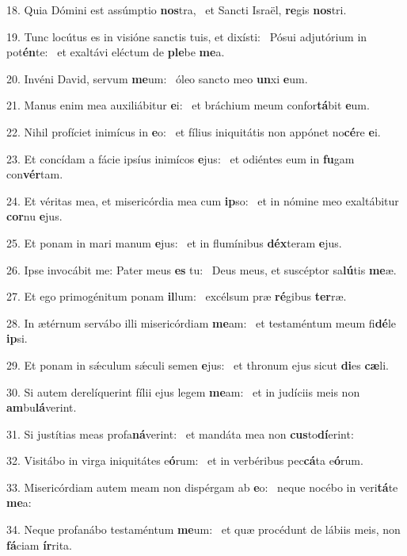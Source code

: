 18. Quia Dómini est assúmptio \textbf{nos}tra, \ast\  et Sancti Israël, \textbf{re}gis \textbf{nos}tri.\

19. Tunc locútus es in visióne sanctis tuis, et dixísti: \dag\  Pósui adjutórium in pot\textbf{én}te: \ast\  et exaltávi eléctum de \textbf{ple}be \textbf{me}a.\

20. Invéni David, servum \textbf{me}um: \ast\  óleo sancto meo \textbf{un}xi \textbf{e}um.\

21. Manus enim mea auxiliábitur \textbf{e}i: \ast\  et bráchium meum confor\textbf{tá}bit \textbf{e}um.\

22. Nihil profíciet inimícus in \textbf{e}o: \ast\  et fílius iniquitátis non appónet no\textbf{cé}re \textbf{e}i.\

23. Et concídam a fácie ipsíus inimícos \textbf{e}jus: \ast\  et odiéntes eum in \textbf{fu}gam con\textbf{vér}tam.\

24. Et véritas mea, et misericórdia mea cum \textbf{ip}so: \ast\  et in nómine meo exaltábitur \textbf{cor}nu \textbf{e}jus.\

25. Et ponam in mari manum \textbf{e}jus: \ast\  et in flumínibus \textbf{déx}teram \textbf{e}jus.\

26. Ipse invocábit me: Pater meus \textbf{es} tu: \ast\  Deus meus, et suscéptor sa\textbf{lú}tis \textbf{me}æ.\

27. Et ego primogénitum ponam \textbf{il}lum: \ast\  excélsum præ \textbf{ré}gibus \textbf{ter}ræ.\

28. In ætérnum servábo illi misericórdiam \textbf{me}am: \ast\  et testaméntum meum fi\textbf{dé}le \textbf{ip}si.\

29. Et ponam in sǽculum sǽculi semen \textbf{e}jus: \ast\  et thronum ejus sicut \textbf{di}es \textbf{cæ}li.\

30. Si autem derelíquerint fílii ejus legem \textbf{me}am: \ast\  et in judíciis meis non \textbf{am}bu\textbf{lá}verint.\

31. Si justítias meas profa\textbf{ná}verint: \ast\  et mandáta mea non \textbf{cus}to\textbf{dí}erint:\

32. Visitábo in virga iniquitátes e\textbf{ó}rum: \ast\  et in verbéribus pec\textbf{cá}ta e\textbf{ó}rum.\

33. Misericórdiam autem meam non dispérgam ab \textbf{e}o: \ast\  neque nocébo in veri\textbf{tá}te \textbf{me}a:\

34. Neque profanábo testaméntum \textbf{me}um: \ast\  et quæ procédunt de lábiis meis, non \textbf{fá}ciam \textbf{ír}rita.\


